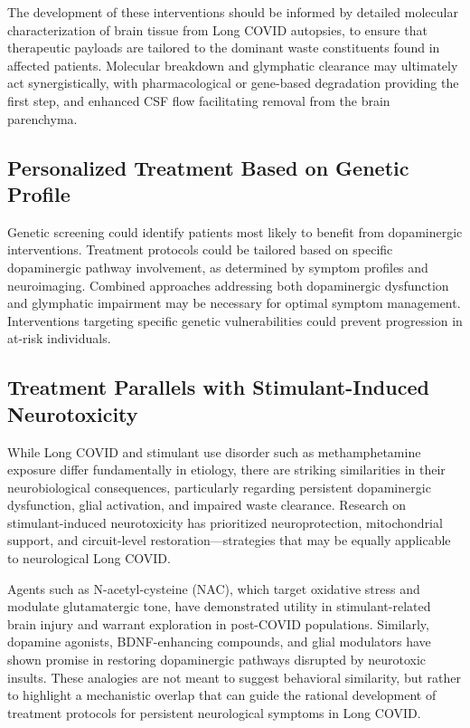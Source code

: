 \documentclass[12pt]{article}
\begin{document}
The development of these interventions should be informed by detailed molecular characterization of brain tissue from Long COVID autopsies, to ensure that therapeutic payloads are tailored to the dominant waste constituents found in affected patients. Molecular breakdown and glymphatic clearance may ultimately act synergistically, with pharmacological or gene-based degradation providing the first step, and enhanced CSF flow facilitating removal from the brain parenchyma.

\subsection{Personalized Treatment Based on Genetic Profile}

Genetic screening could identify patients most likely to benefit from dopaminergic interventions. Treatment protocols could be tailored based on specific dopaminergic pathway involvement, as determined by symptom profiles and neuroimaging. Combined approaches addressing both dopaminergic dysfunction and glymphatic impairment may be necessary for optimal symptom management. Interventions targeting specific genetic vulnerabilities could prevent progression in at-risk individuals.

\subsection{Treatment Parallels with Stimulant-Induced Neurotoxicity}

While Long COVID and stimulant use disorder such as methamphetamine exposure differ fundamentally in etiology, there are striking similarities in their neurobiological consequences, particularly regarding persistent dopaminergic dysfunction, glial activation, and impaired waste clearance. Research on stimulant-induced neurotoxicity has prioritized neuroprotection, mitochondrial support, and circuit-level restoration—strategies that may be equally applicable to neurological Long COVID.

Agents such as N-acetyl-cysteine (NAC), which target oxidative stress and modulate glutamatergic tone, have demonstrated utility in stimulant-related brain injury and warrant exploration in post-COVID populations. Similarly, dopamine agonists, BDNF-enhancing compounds, and glial modulators have shown promise in restoring dopaminergic pathways disrupted by neurotoxic insults. These analogies are not meant to suggest behavioral similarity, but rather to highlight a mechanistic overlap that can guide the rational development of treatment protocols for persistent neurological symptoms in Long COVID.
\end{document}
